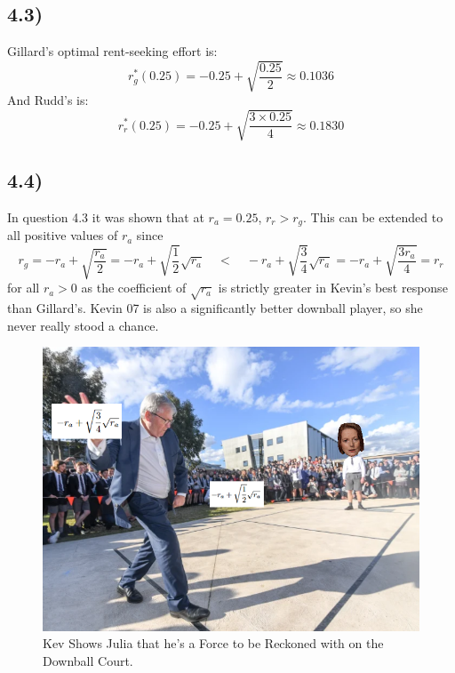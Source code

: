 \documentclass{article}
\begin{document}
\subsection*{4.3)}
Gillard's optimal rent-seeking effort is:
$$r_{g}^{*}(0.25) = -0.25 + \sqrt{\frac{0.25}{2}} \approx 0.1036$$
And Rudd's is:
$$r_{r}^{*}(0.25) = -0.25 + \sqrt{\frac{3 \times 0.25}{4}} \approx 0.1830$$

\subsection*{4.4)}
In question 4.3 it was shown that at $r_{a} = 0.25$, $r_{r} > r_{g}$. This can be extended to all positive values of $r_{a}$ since
$$r_{g} = -r_{a} + \sqrt{\frac{r_{a}}{2}} = -r_{a} + \sqrt{\frac{1}{2}} \sqrt{r_{a}} \quad < \quad -r_{a} + \sqrt{\frac{3}{4}} \sqrt{r_{a}} = -r_{a} + \sqrt{\frac{3 r_{a}}{4}} = r_{r}$$
for all $r_{a} > 0$ as the coefficient of $\sqrt{r_{a}}$ is strictly greater in Kevin's best response than Gillard's. \vfill
\centering
Kevin 07 is also a significantly better downball player, so she never really stood a chance.
\begin{figure}[hb]
    \centering
    \includegraphics[width=0.75\linewidth]{handball}
    \caption{Kev Shows Julia that he's a Force to be Reckoned with on the Downball Court.}
    \label{fig:handball}
\end{figure}
\end{document}
